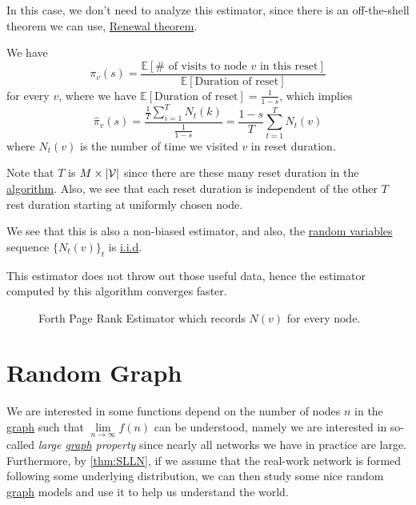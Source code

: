 In this case, we don't need to analyze this estimator, since there is an off-the-shell theorem we can use, \href{https://en.wikipedia.org/wiki/Renewal_theory}{Renewal theorem}.
\begin{theorem}\label{thm:Renewal-theorem}
	We have
	\[
		\pi_v(s) = \frac{\mathbb{E}\left[\# \text{ of visits to node \(v\) in this reset} \right]}{\mathbb{E}\left[\text{Duration of reset} \right] }
	\]
	for every \(v\), where we have \(\mathbb{E}\left[\text{Duration of reset} \right] =\frac{1}{1-s}\), which implies
	\[
		\hat{\pi}_v(s) = \frac{\frac{1}{T}\sum_{i=1}^{T} N_t(k)}{\frac{1}{1-s}} = \frac{1-s}{T}\sum\limits_{t=1}^{T} N_t(v)
	\]
	where \(N_t(v)\) is the number of time we visited \(v\) in reset duration.
\end{theorem}
\begin{note}
	Note that \(T\) is \(M\times \left\vert \mathcal{\MakeUppercase{v}}  \right\vert \) since there are these many reset duration in the
	\hyperref[algo:Monte-Carlo-algorithm-4]{algorithm}. Also, we see that each reset duration is independent of the other \(T\) rest
	duration starting at uniformly chosen node.
\end{note}

We see that this is also a non-biased estimator, and also, the \hyperref[def:random-variable]{random variables} sequence
\(\{N_t(v)\}_t\) is \hyperref[def:i.i.d.]{i.i.d}.

\begin{remark}
	This estimator does not throw out those useful data, hence the estimator computed by this algorithm converges faster.
\end{remark}

\begin{figure}[H]
	\centering
	\caption{Forth Page Rank Estimator which records \(N(v)\) for every node.}
	\label{fig:Monte-Carlo-Estimator-4}
\end{figure}

\chapter{Random Graph}
We are interested in some functions depend on the number of nodes \(n\) in the \hyperref[def:graph]{graph} such that \(\lim\limits_{n\to \infty }f(n)\)
can be understood, namely we are interested in so-called \emph{large \hyperref[def:graph]{graph} property} since nearly all networks we have in practice
are large. Furthermore, by \autoref{thm:SLLN}, if we assume that the real-work network is formed following some underlying distribution, we can then
study some nice random \hyperref[def:graph]{graph} models and use it to help us understand the world.

